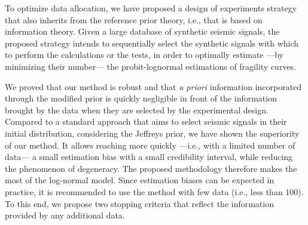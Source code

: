 To optimize data allocation, we have proposed a design of experiments strategy that also inherits from the reference prior theory, i.e., that is based on information theory. Given a large database of synthetic seismic signals, the proposed strategy intends to sequentially select the synthetic signals with which to perform the calculations or the tests, in order to optimally estimate ---by minimizing their number--- the probit-lognormal estimations of fragility curves.

We proved that our method is robust and
that \emph{a priori} information incorporated through the modified prior is quickly negligible in front of the information brought by the data when they are selected by the experimental design.
Compared to a standard approach that aims to select seismic signals in their initial distribution, considering the Jeffreys prior, we have shown the superiority of our method. It allows reaching more quickly ---i.e., with a limited number of data--- a small estimation bias with a small credibility interval, while reducing the phenomenon of degeneracy. The proposed methodology therefore makes the most of the log-normal model. Since estimation biases can be expected in practice, it is recommended to use the method with few data (i.e., less than 100). To this end, we propose two stopping criteria that reflect the information provided by any additional data.
\newpage


